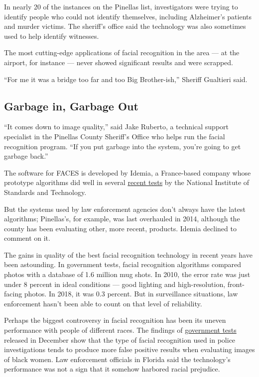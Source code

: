In nearly 20 of the instances on the Pinellas list, investigators were
trying to identify people who could not identify themselves, including
Alzheimer's patients and murder victims. The sheriff's office said the
technology was also sometimes used to help identify witnesses.

The most cutting-edge applications of facial recognition in the area ---
at the airport, for instance --- never showed significant results and
were scrapped.

``For me it was a bridge too far and too Big Brother-ish,'' Sheriff
Gualtieri said.

\hypertarget{garbage-in-garbage-out}{%
\subsection{Garbage in, Garbage Out}\label{garbage-in-garbage-out}}

``It comes down to image quality,'' said Jake Ruberto, a technical
support specialist in the Pinellas County Sheriff's Office who helps run
the facial recognition program. ``If you put garbage into the system,
you're going to get garbage back.''

The software for FACES is developed by Idemia, a France-based company
whose prototype algorithms did well in several
\href{https://www.nist.gov/system/files/documents/2019/09/11/nistir_8271_20190911.pdf}{recent
tests} by the National Institute of Standards and Technology.

But the systems used by law enforcement agencies don't always have the
latest algorithms; Pinellas's, for example, was last overhauled in 2014,
although the county has been evaluating other, more recent, products.
Idemia declined to comment on it.

The gains in quality of the best facial recognition technology in recent
years have been astounding. In government tests, facial recognition
algorithms compared photos with a database of 1.6 million mug shots. In
2010, the error rate was just under 8 percent in ideal conditions ---
good lighting and high-resolution, front-facing photos. In 2018, it was
0.3 percent. But in surveillance situations, law enforcement hasn't been
able to count on that level of reliability.

Perhaps the biggest controversy in facial recognition has been its
uneven performance with people of different races. The findings of
\href{https://nvlpubs.nist.gov/nistpubs/ir/2019/NIST.IR.8280.pdf}{government
tests} released in December show that the type of facial recognition
used in police investigations tends to produce more false positive
results when evaluating images of black women. Law enforcement officials
in Florida said the technology's performance was not a sign that it
somehow harbored racial prejudice.

